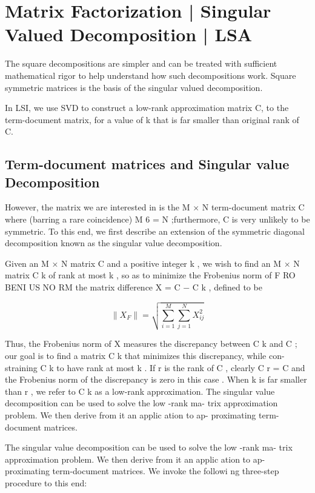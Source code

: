 \section{Matrix Factorization | Singular Valued Decomposition | LSA }
The square decompositions are simpler and can be treated with sufficient mathematical rigor to help understand how such decompositions work. Square symmetric matrices is the basis of the singular valued decomposition.

In LSI, we use SVD to construct a low-rank approximation matrix C, to the term-document matrix, for a value of k that is far smaller than original rank of C. 

\subsection{Term-document matrices and Singular value Decomposition}
However, the matrix we are interested in is the M × N term-document matrix C where (barring a rare coincidence) M 6 = N ;furthermore, C is very unlikely to be symmetric. To this end, we first describe an extension of the symmetric diagonal decomposition known as the singular value decomposition.

Given an M × N matrix C and  a positive  integer k ,  we  wish  to  find  an M × N matrix C k of rank at most k , so as to minimize the Frobenius norm of F RO BENI US NO RM the matrix difference X = C − C k , defined to be

\[
    \| X_{F} \| = \sqrt{\sum_{i=1}^{M} \sum_{j=1}^{N} X_{ij}^2}
\]

Thus, the Frobenius norm of X measures the discrepancy between C k and C ; our goal is to find a matrix C k that minimizes this discrepancy, while con- straining C k to have rank at most k .   If r is the  rank of C ,  clearly C r = C and the Frobenius norm of the discrepancy is zero in this case . When k is far smaller than r , we refer to C k as a low-rank approximation. The singular value decomposition can be used to solve the low -rank ma- trix approximation problem.   We then derive from it an applic ation to ap- proximating term-document matrices.

The singular value decomposition can be used to solve the low -rank ma- trix approximation problem.   We then derive from it an applic ation to ap- proximating term-document matrices.   We invoke the followi ng three-step procedure to this end:

